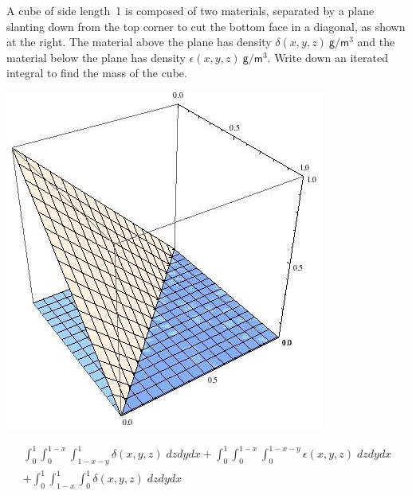 \documentclass[answers,12pt,addpoints]{exam}
\begin{document}
\begin{questions}
\begin{multicols}{2}
\question[25] A cube of side length~1 is composed
of two materials, separated by a plane slanting down
from the top corner to cut the bottom face in a diagonal,
as shown at the right. The material above the plane
has density $\delta\left(x,y,z\right)~\mathsf{g}/\mathsf{m}^3$
and the material
below the plane has density
$\epsilon\left(x,y,z\right)~\mathsf{g}/\mathsf{m}^3$.
Write down an iterated integral to find the mass of the cube.
\begin{center}\includegraphics[scale=.5]{BoxPlane}\end{center}
\end{multicols}
\begin{solution}
\begin{multline*}
\int_0^1\int_0^{1-x}\int_{1-x-y}^1
\delta\left(x,y,z\right)\;dzdydx
+\int_0^1\int_0^{1-x}\int_0^{1-x-y}
\epsilon\left(x,y,z\right)\;dzdydx\\
+\int_0^1\int_{1-x}^1\int_0^1
\delta\left(x,y,z\right)\;dzdydx
\end{multline*}
\end{solution}
\ifprintanswers\else\newpage\fi

\question[25] 
\begin{parts}

\end{parts}
\end{questions}
\end{document}
